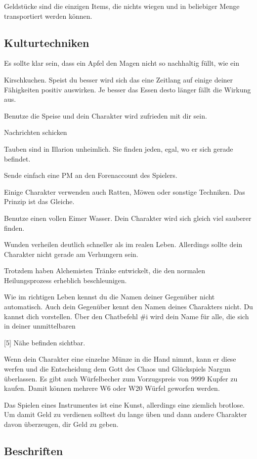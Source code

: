 \documentclass[a4paper,11pt]{book}
\begin{document}
Geldstücke sind die einzigen Items, die nichts wiegen und in beliebiger Menge transportiert werden können.

\subsection{Kulturtechniken}

Es sollte klar sein, dass ein Apfel den Magen nicht so nachhaltig füllt, wie ein

Kirschkuchen. Speist du besser wird sich das eine Zeitlang auf einige deiner Fähigkeiten positiv auswirken. Je besser das Essen desto länger fällt die Wirkung aus.

Benutze die Speise und dein Charakter wird zufrieden mit dir sein.

Nachrichten schicken

Tauben sind in Illarion unheimlich. Sie finden jeden, egal, wo er sich gerade befindet.

Sende einfach eine PM an den Forenaccount des Spielers.

Einige Charakter verwenden auch Ratten, Möwen oder sonstige Techniken. Das Prinzip ist das Gleiche.

Benutze einen vollen Eimer Wasser. Dein Charakter wird sich gleich viel sauberer finden.

Wunden verheilen deutlich schneller als im realen Leben. Allerdings sollte dein Charakter nicht gerade am Verhungern sein.

Trotzdem haben Alchemisten Tränke entwickelt, die den normalen Heilungsprozess erheblich beschleunigen.

Wie im richtigen Leben kennst du die Namen deiner Gegenüber nicht automatisch. Auch dein Gegenüber kennt den Namen deines Charakters nicht. Du kannst dich vorstellen. Über den Chatbefehl \#i wird dein Name für alle, die sich in deiner unmittelbaren

[5] Nähe befinden sichtbar.

Wenn dein Charakter eine einzelne Münze in die Hand nimmt, kann er diese werfen und die Entscheidung dem Gott des Chaos und Glückspiels Nargun überlassen. Es gibt auch Würfelbecher zum Vorzugspreis von 9999 Kupfer zu kaufen. Damit können mehrere W6 oder W20 Würfel geworfen werden.

Das Spielen eines Instrumentes ist eine Kunst, allerdings eine ziemlich brotlose. Um damit Geld zu verdienen solltest du lange üben und dann andere Charakter davon überzeugen, dir Geld zu geben.

\subsection{Beschriften}
\end{document}

